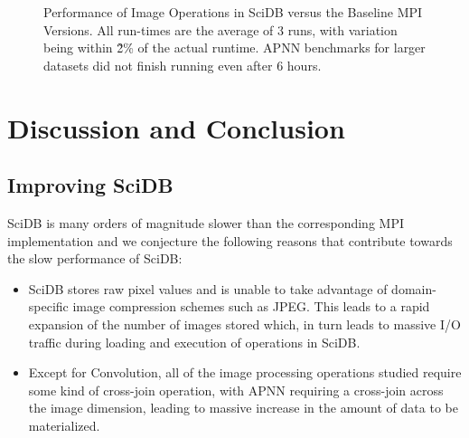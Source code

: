 \documentclass[tog]{acmsiggraph}
\begin{document}
\begin{figure}[htp] \centering
{}
\hspace{1 em}
	\caption{Performance of Image Operations in SciDB versus the Baseline MPI
Versions. All run-times are the average of 3 runs, with variation being within
\~2\% of the actual runtime. APNN benchmarks for larger datasets did not finish
running even after 6 hours.}
	\label{fig:breakdown}
\end{figure}

\section{Discussion and Conclusion}

\subsection{Improving SciDB}
SciDB is many orders of magnitude slower than the corresponding MPI
implementation and we conjecture the following reasons that contribute towards
the slow performance of SciDB:

\begin{itemize}
\item SciDB stores raw pixel values and is unable to take advantage of
domain-specific image compression schemes such as JPEG. This leads to a rapid
expansion of the number of images stored which, in turn leads to massive I/O
traffic during loading and execution of operations in SciDB.
\item Except for Convolution, all of the image processing operations studied
require some kind of cross-join operation, with APNN requiring a cross-join
across the image dimension, leading to massive increase in the amount of data
to be materialized.
\end{itemize}
\end{document}
